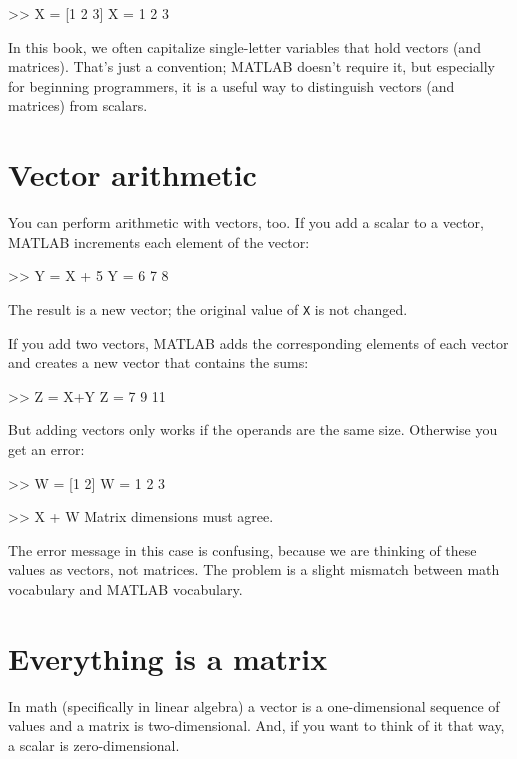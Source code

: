 \documentclass[
]{book}
\numberwithin{Answer}{chapter}
\numberwithin{Exercise}{chapter}
\begin{document}
\begin{code}
>> X = [1 2 3]
X = 1     2     3
\end{code}

In this book, we often capitalize single-letter variables that hold vectors 
(and matrices).
That's just a convention; MATLAB doesn't require it, but especially for beginning programmers, it is a useful way to distinguish vectors (and matrices) from scalars.


\section{Vector arithmetic}

You can perform arithmetic with vectors, too.  If you add a scalar
to a vector, MATLAB increments each element of the vector:

\begin{code}
>> Y = X + 5
Y = 6     7     8
\end{code}

The result is a new vector; the original value of {\tt X} is not
changed.

If you add two vectors, MATLAB adds the corresponding elements of each
vector and creates a new vector that contains the sums:

\begin{code}
>> Z = X+Y
Z = 7     9    11
\end{code}

But adding vectors only works if the operands are the same size.
Otherwise you get an error:

\begin{code}
>> W = [1 2]
W = 1     2     3

>> X + W
Matrix dimensions must agree.
\end{code}

The error message in this case is confusing, because we are thinking
of these values as vectors, not matrices.  The problem is a slight
mismatch between math vocabulary and MATLAB vocabulary.


\section{Everything is a matrix}

In math (specifically in linear algebra) a vector is a one-dimensional
sequence of values and a matrix is two-dimensional. And, if you want
to think of it that way, a scalar is zero-dimensional.
\end{document}
